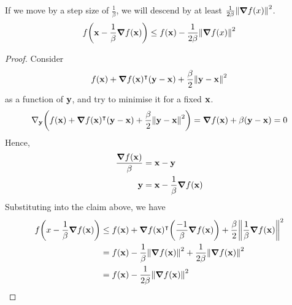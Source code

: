 \begin{corollary}
	If we move by a step size of \(\frac{1}{\beta}\), we will descend by at least \(\frac{1}{2\beta}\norm{\grad{f(x)}}^2\).
	\[
		f\qty(\vb x - \frac{1}{\beta}\grad{f(\vb x)}) \leq f(\vb x) - \frac{1}{2\beta}\norm{\grad{f(x)}}^2
	\]
\end{corollary}
\begin{proof}
	Consider
	\[
		f(\vb x) + \grad{f(\vb x)}^\intercal (\vb y - \vb x) + \frac{\beta}{2}\norm{\vb y - \vb x}^2
	\]
	as a function of \(\vb y\), and try to minimise it for a fixed \(\vb x\).
	\[
		\nabla_{\vb y} \qty(f(\vb x) + \grad{f(\vb x)}^\intercal (\vb y - \vb x) + \frac{\beta}{2}\norm{\vb y - \vb x}^2) = \grad{f(\vb x)} + \beta(\vb y - \vb x) = 0
	\]
	Hence,
	\begin{align*}
		\frac{\grad{f(\vb x)}}{\beta} & = \vb x - \vb y                          \\
		\vb y                         & = \vb x - \frac{1}{\beta}\grad{f(\vb x)}
	\end{align*}
	Substituting into the claim above, we have
	\begin{align*}
		f\qty(x - \frac{1}{\beta}\grad{f(\vb x)}) & \leq f(\vb x) + \grad{f(\vb x)}^\intercal \qty(\frac{-1}{\beta}\grad{f(\vb x)}) + \frac{\beta}{2}\norm{\frac{1}{\beta}\grad{f(\vb x)}}^2 \\
		                                          & = f(\vb x) - \frac{1}{\beta}\norm{\grad{f(\vb x)}}^2 + \frac{1}{2\beta}\norm{\grad{f(\vb x)}}^2                                           \\
		                                          & = f(\vb x) - \frac{1}{2\beta}\norm{\grad{f(\vb x)}}^2                                                                                     \\
	\end{align*}
\end{proof}

